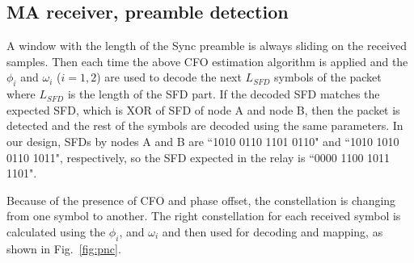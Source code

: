 \subsection{MA receiver, preamble detection}
A window with the length of the Sync preamble is always sliding on the received samples. Then each time the above CFO estimation algorithm is applied and the $\phi_i$ and $\omega_i$ ($i=1,2$) are used to decode the next $L_{SFD}$ symbols of the packet where $L_{SFD}$  is the length of the SFD part. If the decoded SFD matches the expected SFD, which is XOR of SFD of node A and node B, %
 then the packet is detected and the rest of the symbols are decoded using the same parameters. In our design, SFDs by nodes A  and B are ``1010 0110 1101 0110" and ``1010 1010 0110 1011", respectively, so the SFD expected in the relay is ``0000 1100 1011 1101". 
 
Because of the presence of CFO and phase offset, the constellation is changing from one symbol to another. The right constellation for each received symbol is calculated using the $\phi_i$, and $\omega_i$ and then used for decoding and mapping, as shown in Fig.~\ref{fig:pnc}. 
